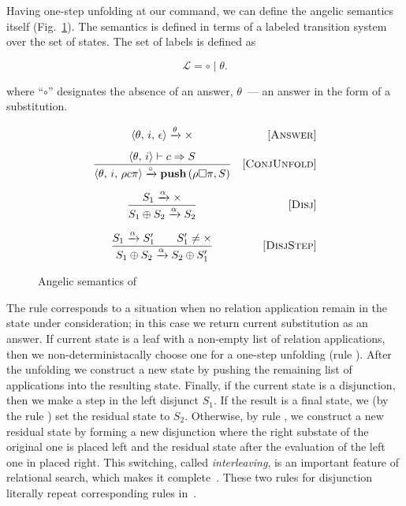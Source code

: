 Having one-step unfolding at our command, we can define the angelic semantics itself (Fig.~\ref{fair:angelic-semantics}). The semantics is defined in terms of a labeled transition
system over the set of states. The set of labels is defined as

\[
\mathcal{L} = \circ \mid \theta.
\]

where ``$\circ$'' designates the absence of an answer, $\theta$~--- an answer in the form of a substitution.

\begin{figure}[h!]
\[\begin{array}{cr}
     {\langle \theta,\, i,\, \epsilon \rangle \xrightarrow{\theta} \times}  
&     \mbox{[\textsc{Answer}]} \\[3mm]
\dfrac{\langle \theta,\, i \rangle \vdash c \Rightarrow S}
      {\langle \theta,\, i,\, \rho c \pi \rangle \xrightarrow{\circ} \mbox{\bf push}\,(\rho \Box \pi, S)}
&     \mbox{[\textsc{ConjUnfold}]} \\[6mm]
\dfrac{S_1 \xrightarrow{\alpha} \times}
      {S_1 \oplus S_2 \xrightarrow{\alpha} S_2}
&     \mbox{[\textsc{Disj}]} \\[6mm]
\dfrac{S_1 \xrightarrow{\alpha} S^\prime_1 \qquad S^\prime_1 \not= \times}
      {S_1 \oplus S_2 \xrightarrow{\alpha} S_2 \oplus S^\prime_1}
&     \mbox{[\textsc{DisjStep}]}
\end{array}\]
\caption{Angelic semantics of \mk}
\label{fair:angelic-semantics}
\end{figure}

The rule  corresponds to a situation when no relation application remain in the state under consideration; in this case we return current substitution as an answer.
If current state is a leaf with a non-empty list of relation applications, then we non-deterministacally choose one for a one-step unfolding (rule ). After the
unfolding we construct a new state by pushing the remaining list of applications into the resulting state. Finally, if the current state is a disjunction, then we make a step in
the left disjunct $S_1$. If the result is a final state, we (by the rule ) set the residual state to $S_2$. Otherwise, by rule , we construct a
new residual state by forming a new disjunction where the right substate of the original one is placed left and the residual state after the evaluation of the left one in
placed right. This switching, called \emph{interleaving}, is an important feature of relational search, which makes it complete~\cite{fair:interleaving}. These
two rules for disjunction literally repeat corresponding rules in~\cite{fair:semantics}.

